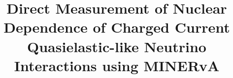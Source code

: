 \documentclass[aps,prl,preprint,showpacs,superscriptaddress,nofootinbib,linenumbers]{revtex4}
\begin{document}
\ifnum{}
\fi

\title{Direct Measurement of Nuclear Dependence of Charged Current Quasielastic-like Neutrino Interactions using MINERvA}


\newcommand{\deceased}{Deceased}

\newcommand{\wroclaw}{Institute of Theoretical Physics, Wroc\l aw University, Wroc\l aw, Poland}    

\end{document}
